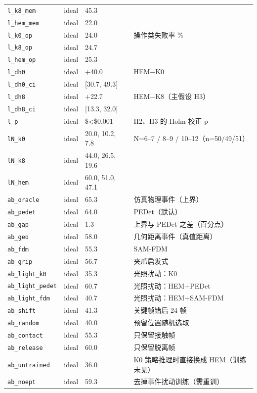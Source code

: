 \begin{longtable}{p{3.2cm}p{0.9cm}p{4.2cm}p{6.2cm}}
\texttt{l\_k8\_mem} & ideal & 45.3 & \\
\texttt{l\_hem\_mem} & ideal & 22.0 & \\
\texttt{l\_k0\_op} & ideal & 24.0 & 操作类失败率 \%\\
\texttt{l\_k8\_op} & ideal & 24.7 & \\
\texttt{l\_hem\_op} & ideal & 25.3 & \\
\texttt{l\_dh0} & ideal & +40.0 & HEM−K0\\
\texttt{l\_dh0\_ci} & ideal & [30.7, 49.3] & \\
\texttt{l\_dh8} & ideal & +22.7 & HEM−K8（主假设 H3）\\
\texttt{l\_dh8\_ci} & ideal & [13.3, 32.0] & \\
\texttt{l\_p} & ideal & \$<\$0.001 & H2、H3 的 Holm 校正 p\\
\texttt{lN\_k0} & ideal & 20.0, 10.2, 7.8 & N=6–7 / 8–9 / 10–12（n=50/49/51）\\
\texttt{lN\_k8} & ideal & 44.0, 26.5, 19.6 & \\
\texttt{lN\_hem} & ideal & 60.0, 51.0, 47.1 & \\
\texttt{ab\_oracle} & ideal & 65.3 & 仿真物理事件（上界）\\
\texttt{ab\_pedet} & ideal & 64.0 & PEDet（默认）\\
\texttt{ab\_gap} & ideal & 1.3 & 上界与 PEDet 之差（百分点）\\
\texttt{ab\_geo} & ideal & 58.0 & 几何距离事件（真值距离）\\
\texttt{ab\_fdm} & ideal & 55.3 & SAM-FDM\\
\texttt{ab\_grip} & ideal & 56.7 & 夹爪启发式\\
\texttt{ab\_light\_k0} & ideal & 35.3 & 光照扰动：K0\\
\texttt{ab\_light\_pedet} & ideal & 60.7 & 光照扰动：HEM+PEDet\\
\texttt{ab\_light\_fdm} & ideal & 40.7 & 光照扰动：HEM+SAM-FDM\\
\texttt{ab\_shift} & ideal & 41.3 & 关键帧错后 24 帧\\
\texttt{ab\_random} & ideal & 40.0 & 预留位置随机选取\\
\texttt{ab\_contact} & ideal & 55.3 & 只保留接触帧\\
\texttt{ab\_release} & ideal & 60.0 & 只保留脱离帧\\
\texttt{ab\_untrained} & ideal & 36.0 & K0 策略推理时直接换成 HEM（训练未见）\\
\texttt{ab\_noept} & ideal & 59.3 & 去掉事件扰动训练（需重训）\\

\end{longtable}
